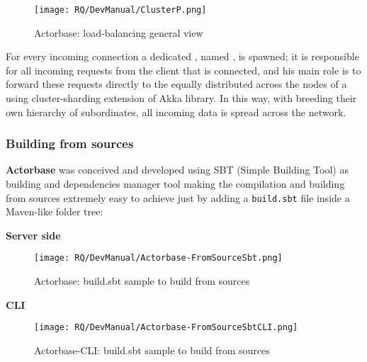 \documentclass{scalatekids-article}
\begin{document}
\begin{figure}[H]
  \begin{center}
    \texttt{[image: RQ/DevManual/ClusterP.png]}
    \caption{Actorbase: load-balancing general view}
  \end{center}
\end{figure}

For every incoming connection a dedicated , named
, is spawned; it is responsible for all incoming requests
from the client that is connected, and his main role is to forward these
requests directly to the   equally distributed across
the nodes of a  using cluster-sharding extension of Akka library.
In this way, with   breeding their own hierarchy of
subordinates, all incoming data is spread across the  network.

\subsubsection{Building from sources}

\textbf{Actorbase} was conceived and developed using SBT (Simple Building Tool)
as building and dependencies manager tool making the compilation and building
from sources extremely easy to achieve just by adding a \verb=build.sbt= file
inside a Maven-like folder tree:

\textbf{Server side}

\begin{figure}[H]
  \begin{center}
    \texttt{[image: RQ/DevManual/Actorbase-FromSourceSbt.png]}
    \caption{Actorbase: build.sbt sample to build from sources}
  \end{center}
\end{figure}

\textbf{CLI}

\begin{figure}[H]
  \begin{center}
    \texttt{[image: RQ/DevManual/Actorbase-FromSourceSbtCLI.png]}
    \caption{Actorbase-CLI: build.sbt sample to build from sources}
  \end{center}
\end{figure}
\end{document}
